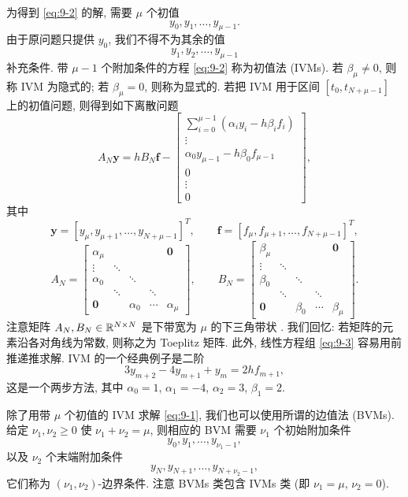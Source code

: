 为得到 \eqref{eq:9-2} 的解, 需要 $\mu$ 个初值
\[
  y_0,y_1,\ldots,y_{\mu-1}.
\]
由于原问题只提供 $y_0$, 我们不得不为其余的值
\[
  y_1,y_2,\ldots,y_{\mu-1}
\]
补充条件. 带 $\mu-1$ 个附加条件的方程 \eqref{eq:9-2} 称为初值法 (IVMs). 若 $\beta_{\mu}\neq0$, 则称 IVM 为隐式的; 若 $\beta_{\mu}=0$, 则称为显式的. 若把 IVM 用于区间 $[t_0,t_{N+\mu-1}]$ 上的初值问题, 则得到如下离散问题
\begin{equation}
  A_N\mathbf{y}=hB_N\mathbf{f}-\left[
  \begin{array}{c}
    \sum\limits_{i=0}^{\mu-1}(\alpha_iy_i-h\beta_if_i)\\
    \vdots\\
    \alpha_0y_{\mu-1}-h\beta_0f_{\mu-1}\\
    0\\
    \vdots\\
    0
  \end{array}\right],
  \label{eq:9-3}
\end{equation}
其中
\[
  \mathbf{y}=[y_{\mu},y_{\mu+1},\ldots,y_{N+\mu-1}]^T,\qquad
  \mathbf{f}=[f_{\mu},f_{\mu+1},\ldots,f_{N+\mu-1}]^T,
\]
\[
  A_N=\begin{bmatrix}
    \alpha_{\mu} & & & & \mathbf{0}\\
    \vdots & \ddots & & & \\
    \alpha_0 & & \ddots & & \\
    & \ddots & & \ddots & \\
    \mathbf{0} & & \alpha_0 & \cdots & \alpha_{\mu}
  \end{bmatrix},\qquad
  B_N=\begin{bmatrix}
    \beta_{\mu} & & & & \mathbf{0}\\
    \vdots & \ddots & & & \\
    \beta_0 & & \ddots & & \\
    & \ddots & & \ddots & \\
    \mathbf{0} & & \beta_0 & \cdots & \beta_{\mu}
  \end{bmatrix}.
\]
注意矩阵 $A_N,B_N\in\mathbb{R}^{N\times N}$ 是下带宽为 $\mu$ 的下三角带状 . 我们回忆: 若矩阵的元素沿各对角线为常数, 则称之为 Toeplitz 矩阵. 此外, 线性方程组 \eqref{eq:9-3} 容易用前推递推求解. IVM 的一个经典例子是二阶
\[
  3y_{m+2}-4y_{m+1}+y_m=2hf_{m+1},
\]
这是一个两步方法, 其中 $\alpha_0=1$, $\alpha_1=-4$, $\alpha_2=3$, $\beta_1=2$.

除了用带 $\mu$ 个初值的 IVM 求解 \eqref{eq:9-1}, 我们也可以使用所谓的边值法 (BVMs). 给定 $\nu_1,\nu_2\geqslant0$ 使 $\nu_1+\nu_2=\mu$, 则相应的 BVM 需要 $\nu_1$ 个初始附加条件
\[
  y_0,y_1,\ldots,y_{\nu_1-1},
\]
以及 $\nu_2$ 个末端附加条件
\[
  y_N,y_{N+1},\ldots,y_{N+\nu_2-1},
\]
它们称为 $(\nu_1,\nu_2)$-边界条件. 注意 BVMs 类包含 IVMs 类 (即 $\nu_1=\mu$, $\nu_2=0$).

